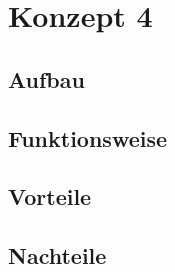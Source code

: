 \section{Konzept 4}

\subsection{Aufbau}

\subsection{Funktionsweise}

\subsection{Vorteile}

\subsection{Nachteile}
